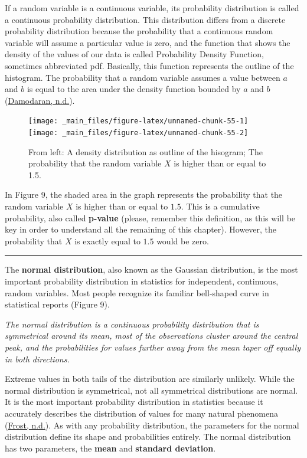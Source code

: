 \documentclass[
]{svmono}
\begin{document}
If a random variable is a continuous variable, its probability
distribution is called a continuous probability distribution. This
distribution differs from a discrete probability distribution because
the probability that a continuous random variable will assume a
particular value is zero, and the function that shows the density of the
values of our data is called Probability Density Function, sometimes
abbreviated pdf. Basically, this function represents the outline of the
histogram. The probability that a random variable assumes a value
between \(a\) and \(b\) is equal to the area under the density function
bounded by \(a\) and \(b\) (\protect\hyperlink{ref-damodaran}{Damodaran, n.d.}).

\begin{figure}[H]
\texttt{[image: \_main\_files/figure-latex/unnamed-chunk-55-1]} \texttt{[image: \_main\_files/figure-latex/unnamed-chunk-55-2]} \caption{From left: A density distribution as outline of the hisogram; The probability that the random variable $X$ is higher than or equal to 1.5.}\label{fig:unnamed-chunk-55}
\end{figure}

In Figure 9, the shaded area in the graph represents the probability
that the random variable \(X\) is higher than or equal to \(1.5\). This is a
cumulative probability, also called \textbf{p-value} (please, remember this
definition, as this will be key in order to understand all the remaining
of this chapter). However, the probability that \(X\) is exactly equal to
\(1.5\) would be zero.

\begin{center}\rule{0.5\linewidth}{0.5pt}\end{center}

The \textbf{normal distribution}, also known as the Gaussian distribution, is
the most important probability distribution in statistics for
independent, continuous, random variables. Most people recognize its
familiar bell-shaped curve in statistical reports (Figure 9).

\emph{The normal distribution is a continuous probability distribution that
is symmetrical around its mean, most of the observations cluster around
the central peak, and the probabilities for values further away from the
mean taper off equally in both directions.}

Extreme values in both tails of the distribution are similarly unlikely.
While the normal distribution is symmetrical, not all symmetrical
distributions are normal. It is the most important probability
distribution in statistics because it accurately describes the
distribution of values for many natural phenomena (\protect\hyperlink{ref-frost}{Frost, n.d.}). As with any
probability distribution, the parameters for the normal distribution
define its shape and probabilities entirely. The normal distribution has
two parameters, the \textbf{mean} and \textbf{standard deviation}.
\end{document}
